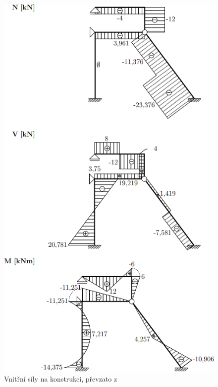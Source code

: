 \begin{figure}[H]
    \includegraphics{assets/figures/framesss/example_internal_forces.png}
    \caption[Vnitřní síly na konstrukci]{Vnitřní síly na konstrukci, převzato z \cite[Příklad 5.2]{sbirka_prikladu}}
    \label{fig:framesss_example_internal_forces}
\end{figure}